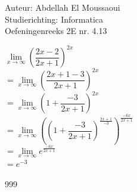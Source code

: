 \documentclass[a4paper]{article}
\begin{document}
  
\noindent \large Auteur: Abdellah El Moussaoui \\
\noindent \large Studierichting: Informatica\\
\noindent \large Oefeningenreeks 2E nr. 4.13\\

\medskip

\normalsize


$\lim\limits_{x\to\infty} \left(\dfrac{2x-2}{2x+1}\right)^{2x}$\\


$= \lim\limits_{x\to\infty} \left(\dfrac{2x+1-3}{2x+1}\right)^{2x}$\\


$= \lim\limits_{x\to\infty} \left(1 + \dfrac{-3}{2x+1}\right)^{2x}$\\


$= \lim\limits_{x\to\infty} \left(\left(1 + \dfrac{-3}{2x+1}\right)^{\tfrac{2x+1}{-3}}\right)^{\tfrac{-6x}{2x+1}}$\\


$= \lim\limits_{x\to\infty} e^{\tfrac{-6x}{2x+1}}$\\

$ = e^{-3}$


\begin{thebibliography}{999}
\end{thebibliography}
\end{document}
